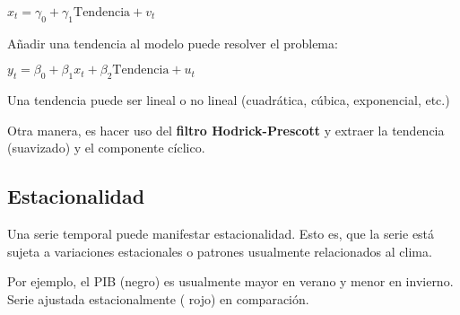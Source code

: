 \documentclass[10pt, a4paper, landscape]{extarticle}
\begin{document}
\begin{multicols}{3}
\begin{center}
	$x_t = \gamma_0 + \gamma_1 \mathrm{Tendencia} + v_t$
\end{center}

Añadir una tendencia al modelo puede resolver el problema:

\begin{center}
	$y_t = \beta_0 + \beta_1 x_t + \beta_2 \mathrm{Tendencia} + u_t$
\end{center}

Una tendencia puede ser lineal o no lineal (cuadrática, cúbica, exponencial, etc.)

Otra manera, es hacer uso del \textbf{filtro Hodrick-Prescott} y extraer la tendencia (suavizado) y el componente cíclico.

\subsection*{Estacionalidad}

\setlength{\multicolsep}{0pt}
\begin{multicols}{2}

	Una serie temporal puede manifestar estacionalidad. Esto es, que la serie está sujeta a variaciones estacionales o patrones usualmente relacionados al clima.

	Por ejemplo, el PIB (negro) es usualmente mayor en verano y menor en invierno. Serie ajustada estacionalmente ({\color{red} rojo}) en comparación.

\columnbreak


\end{multicols}
\end{multicols}
\end{document}
